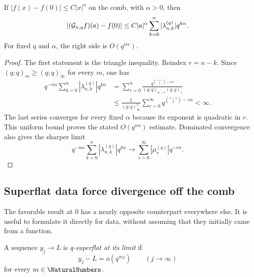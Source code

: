\begin{proposition}
\label{g2:prop:holder-filter}
If $|f(x)-f(0)|\le C|x|^\alpha$ on the comb, with $\alpha>0$, then
\begin{equation}
 |(\mathcal G_{n,q}f)(a)-f(0)|
 \le C|a|^\alpha
 \sum_{k=0}^n|\lambda_{n,k}^{(q)}|q^{k\alpha}.
 \label{g2:eq:holder-bound}
\end{equation}
For fixed $q$ and $\alpha$, the right side is $O(q^{n\alpha})$.
\end{proposition}

\begin{proof}
The first statement is the triangle inequality.  Reindex $r=n-k$.  Since
$(q;q)_m\ge(q;q)_\infty$ for every $m$, one has
\begin{align*}
 q^{-n\alpha}
 \sum_{k=0}^n|\lambda_{n,k}^{(q)}|q^{k\alpha}
 &=\sum_{r=0}^n
 \frac{q^{\binom{r+1}{2}-r\alpha}}
 {(q;q)_{n-r}(q;q)_r}\\
 &\le \frac1{(q;q)_\infty^2}
 \sum_{r=0}^\infty q^{\binom{r+1}{2}-r\alpha}<\infty.
\end{align*}
The last series converges for every fixed $\alpha$ because its exponent is
quadratic in $r$.  This uniform bound proves the stated $O(q^{n\alpha})$
estimate.  Dominated convergence also gives the sharper limit
\[
 q^{-n\alpha}
 \sum_{k=0}^n|\lambda_{n,k}^{(q)}|q^{k\alpha}
 \longrightarrow
 \sum_{r=0}^\infty|\mu_r^{(q)}|q^{-r\alpha}.
\]
\end{proof}

\subsection{Superflat data force divergence off the comb}

The favorable result at $0$ has a nearly opposite counterpart everywhere
else.  It is useful to formulate it directly for data, without assuming that
they initially came from a function.

\begin{definition}
A sequence $y_j\to L$ is \emph{$q$-superflat at its limit} if
\begin{equation}
 y_j-L=o(q^{mj})\qquad(j\to\infty)
 \label{g2:eq:q-superflat}
\end{equation}
for every $m\in\NaturalNumbers$.
\end{definition}

